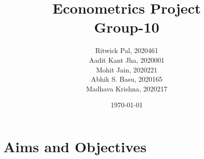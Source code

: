\documentclass[12pt, A4]{report}
\title{\textbf{Econometrics Project} \\
        Group-10}
\author{
        Ritwick Pal, 2020461 \\
        Aadit Kant Jha, 2020001 \\
        Mohit Jain, 2020221 \\
        Abhik S. Basu, 2020165 \\
        Madhava Krishna, 2020217
    }
\date{\today}
\begin{document}
    \maketitle

    \tableofcontents

    \chapter{Aims and Objectives}
\end{document}

